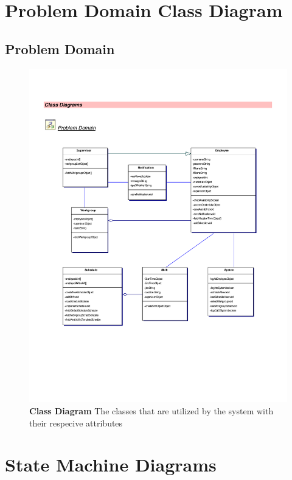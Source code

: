 \documentclass[letterpaper,12pt]{report}
\begin{document}
\chapter{Problem Domain Class Diagram}
\section{Problem  Domain}
\newpage
\begin{figure}[hbp]
 \includegraphics[scale=0.9,trim=10mm 60mm 25mm 20mm]{diagrams/cd_problem.pdf}
 \caption{\small
\textbf{Class Diagram} \space \newline The classes that are utilized by the system with their respecive attributes}\label{fig:problemDomain}
\end{figure}
\newpage
\clearpage
\chapter{State Machine Diagrams}
\end{document}
